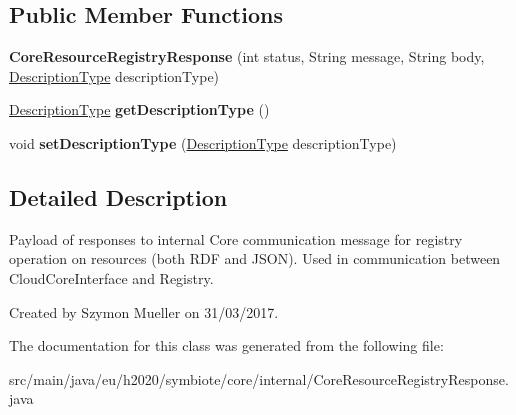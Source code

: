 \subsection*{Public Member Functions}
\begin{DoxyCompactItemize}
\item 
\mbox{\label{classeu_1_1h2020_1_1symbiote_1_1core_1_1internal_1_1CoreResourceRegistryResponse_a635a882735b63b2597fbef6139311f08}} 
{\bfseries Core\+Resource\+Registry\+Response} (int status, String message, String body, \hyperlink{enumeu_1_1h2020_1_1symbiote_1_1core_1_1internal_1_1DescriptionType}{Description\+Type} description\+Type)
\item 
\mbox{\label{classeu_1_1h2020_1_1symbiote_1_1core_1_1internal_1_1CoreResourceRegistryResponse_a556a4a49442d3b87ef276e0b9de40154}} 
\hyperlink{enumeu_1_1h2020_1_1symbiote_1_1core_1_1internal_1_1DescriptionType}{Description\+Type} {\bfseries get\+Description\+Type} ()
\item 
\mbox{\label{classeu_1_1h2020_1_1symbiote_1_1core_1_1internal_1_1CoreResourceRegistryResponse_a30318a5a93b726bd438cd20314eb3fe1}} 
void {\bfseries set\+Description\+Type} (\hyperlink{enumeu_1_1h2020_1_1symbiote_1_1core_1_1internal_1_1DescriptionType}{Description\+Type} description\+Type)
\end{DoxyCompactItemize}


\subsection{Detailed Description}
Payload of responses to internal Core communication message for registry operation on resources (both R\+DF and J\+S\+ON). Used in communication between Cloud\+Core\+Interface and Registry. 

Created by Szymon Mueller on 31/03/2017. 

The documentation for this class was generated from the following file\+:\begin{DoxyCompactItemize}
\item 
src/main/java/eu/h2020/symbiote/core/internal/Core\+Resource\+Registry\+Response.\+java\end{DoxyCompactItemize}
